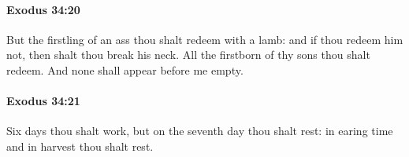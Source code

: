 		\paragraph{Exodus 34:20} %
			\label{EXODUS-34-20}

			But the firstling of an ass thou shalt redeem with a lamb: and if thou redeem him not, then shalt thou break his neck. All the firstborn of thy sons thou shalt redeem. And none shall appear before me empty.


		\paragraph{Exodus 34:21} %
			\label{EXODUS-34-21}

			Six days thou shalt work, but on the seventh day thou shalt rest: in earing time and in harvest thou shalt rest.


